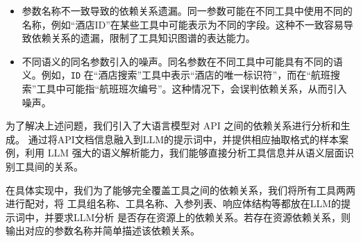 \begin{itemize}
    \item 参数名称不一致导致的依赖关系遗漏。同一参数可能在不同工具中使用不同的名称，例如“酒店ID”在某些工具中可能表示为不同的字段。这种不一致容易导致依赖关系的遗漏，限制了工具知识图谱的表达能力。
    \item 不同语义的同名参数引入的噪声。同名参数在不同工具中可能具有不同的语义。例如，\texttt{ID} 在“酒店搜索”工具中表示“酒店的唯一标识符”，而在“航班搜索”工具中可能指“航班班次编号”。这种情况下，会误判依赖关系，从而引入噪声。
\end{itemize}

为了解决上述问题，我们引入了大语言模型对 API 之间的依赖关系进行分析和生成。
通过将API文档信息融入到LLM的提示词中，并提供相应抽取格式的样本案例，利用 LLM 强大的语义解析能力，我们能够直接分析工具信息并从语义层面识别工具间的关系。

在具体实现中，我们为了能够完全覆盖工具之间的依赖关系，我们将所有工具两两进行配对，将
工具组名称、工具名称、入参列表、响应体结构等都放在LLM的提示词中，并要求LLM分析
是否存在资源上的依赖关系。若存在资源依赖关系，则输出对应的参数名称并简单描述该依赖关系。


